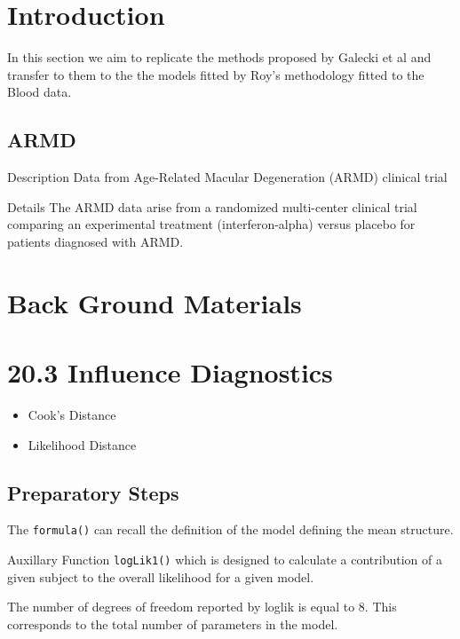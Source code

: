 \documentclass[a4paper,12pt]{article}
\begin{document}
 	\tableofcontents

\section{Introduction}
In this section we aim to replicate the methods proposed by Galecki et al and transfer to them to the
the models fitted by Roy's methodology fitted to the Blood data.

\subsection{ARMD}
Description
Data from Age-Related Macular Degeneration (ARMD) clinical trial

Details
The ARMD data arise from a randomized multi-center clinical trial comparing an experimental treatment (interferon-alpha) versus placebo for patients diagnosed with ARMD.

\section{Back Ground Materials}



\section{20.3  Influence Diagnostics}

\begin{itemize}
\item Cook's Distance
\item Likelihood Distance
\end{itemize}

\subsection{Preparatory Steps}

The \texttt{formula()} can recall the definition of the model defining the mean structure.

Auxillary Function \texttt{logLik1()} which is designed to calculate a contribution of a given subject to the overall likelihood for a given model.


The number of degrees of freedom reported by loglik is equal to 8. This corresponds
to the total number of parameters in the model.
\end{document}
